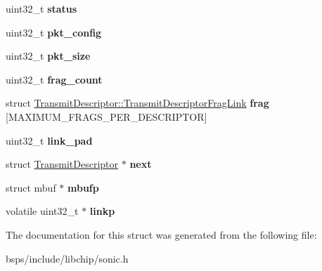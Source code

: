 \begin{DoxyCompactItemize}
\item 
\mbox{\label{structTransmitDescriptor_a9b839421e7f4da592c2d71449a043951}} 
uint32\+\_\+t {\bfseries status}
\item 
\mbox{\label{structTransmitDescriptor_a389aefa05fcd7e90c7141b7a6d2051eb}} 
uint32\+\_\+t {\bfseries pkt\+\_\+config}
\item 
\mbox{\label{structTransmitDescriptor_a44b3242a6837edb02710c524045f7474}} 
uint32\+\_\+t {\bfseries pkt\+\_\+size}
\item 
\mbox{\label{structTransmitDescriptor_a21b1c1e3a76bf3872e383f6db06e141d}} 
uint32\+\_\+t {\bfseries frag\+\_\+count}
\item 
\mbox{\label{structTransmitDescriptor_aaaafe76c930b7c869ae506ebf99e7a9a}} 
struct \mbox{\hyperlink{structTransmitDescriptor_1_1TransmitDescriptorFragLink}{Transmit\+Descriptor\+::\+Transmit\+Descriptor\+Frag\+Link}} {\bfseries frag} \mbox{[}M\+A\+X\+I\+M\+U\+M\+\_\+\+F\+R\+A\+G\+S\+\_\+\+P\+E\+R\+\_\+\+D\+E\+S\+C\+R\+I\+P\+T\+OR\mbox{]}
\item 
\mbox{\label{structTransmitDescriptor_a627e2befb6a8f09f8e34ff69b4e2491e}} 
uint32\+\_\+t {\bfseries link\+\_\+pad}
\item 
\mbox{\label{structTransmitDescriptor_ace23567315868418f73b02951100b0bc}} 
struct \mbox{\hyperlink{structTransmitDescriptor}{Transmit\+Descriptor}} $\ast$ {\bfseries next}
\item 
\mbox{\label{structTransmitDescriptor_adafda5b4979e62d1d78c90511990a033}} 
struct mbuf $\ast$ {\bfseries mbufp}
\item 
\mbox{\label{structTransmitDescriptor_ab4c7a6469166402f96ed6a0fd552ee2e}} 
volatile uint32\+\_\+t $\ast$ {\bfseries linkp}
\end{DoxyCompactItemize}


The documentation for this struct was generated from the following file\+:\begin{DoxyCompactItemize}
\item 
bsps/include/libchip/sonic.\+h\end{DoxyCompactItemize}
